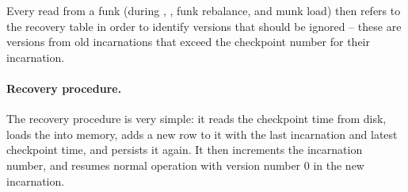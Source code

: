 Every read from a funk  (during ,  , funk rebalance,  and munk load) then
refers to the recovery table in order to identify versions that should be ignored -- these are versions from old incarnations that exceed the checkpoint number for their incarnation. 

\paragraph{Recovery procedure.} The recovery procedure is very simple: it reads the checkpoint time from disk, loads the  into memory, adds a new row to it with the last incarnation and latest checkpoint time, and persists it again. It then increments the incarnation number, and resumes normal operation with version number $0$ in the new incarnation.












